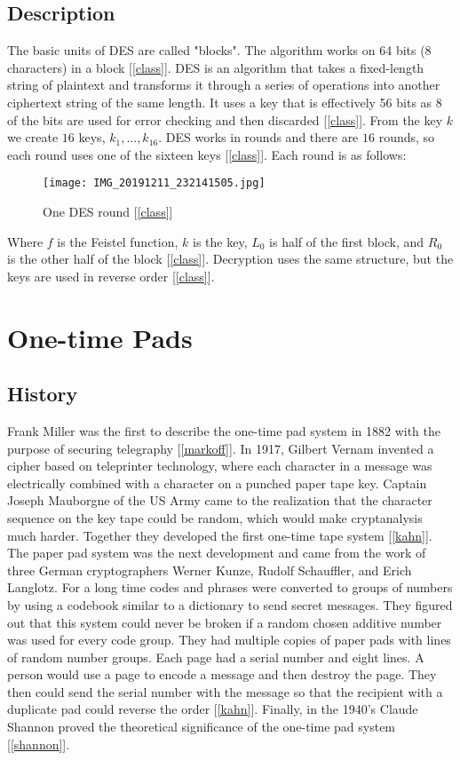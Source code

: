 \documentclass[12pt]{article}
\begin{document}
\subsection{Description}
The basic units of DES  are called "blocks". The algorithm works on 64 bits (8 characters) in a block [\ref{class}]. DES is an algorithm that takes a fixed-length string of plaintext and transforms it through a series of operations into another ciphertext string of the same length. It uses a key that is effectively 56 bits as 8 of the bits are used for error checking and then discarded [\ref{class}]. From the key $k$ we create $16$ keys, $k_1,...,k_{16}$. DES works in rounds and there are $16$ rounds, so each round uses one of the sixteen keys [\ref{class}]. Each round is as follows:\\
\begin{figure}[H]
        \texttt{[image: IMG\_20191211\_232141505.jpg]}
        \caption{One DES round [\ref{class}]}
        \label{fig:340}
    \end{figure}
Where $f$ is the Feistel function, $k$ is the key, $L_0$ is half of the first block, and $R_0$ is the other half of the block [\ref{class}]. Decryption uses the same structure, but the keys are used in reverse order [\ref{class}]. 

\section{One-time Pads}

\subsection{History}
Frank Miller was the first to describe the one-time pad system in 1882 with the purpose of securing telegraphy [\ref{markoff}]. In 1917, Gilbert Vernam invented a cipher based on teleprinter technology, where each character in a message was electrically combined with a character on a punched paper tape key. Captain Joseph Mauborgne of the US Army came to the realization that the character sequence on the key tape could be random, which would make cryptanalysis much harder. Together they developed the first one-time tape system [\ref{kahn}]. The paper pad system was the next development and came from the work of three German cryptographers Werner Kunze, Rudolf Schauffler, and Erich Langlotz. For a long time codes and phrases were converted to groups of numbers by using a codebook similar to a dictionary to send secret messages. They figured out that this system could never be broken if a random chosen additive number was used for every code group. They had multiple copies of paper pads with lines of random number groups. Each page had a serial number and eight lines. A person would use a page to encode a message and then destroy the page. They then could send the serial number with the message so that the recipient with a duplicate pad could reverse the order [\ref{kahn}]. Finally, in the 1940's Claude Shannon proved the theoretical significance of the one-time pad system [\ref{shannon}].  
\end{document}
